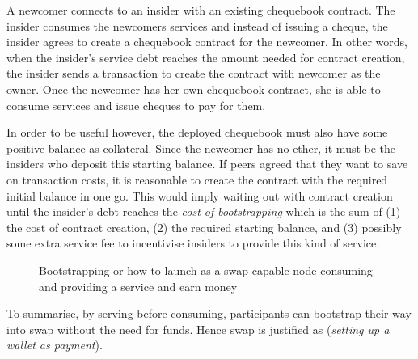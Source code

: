 A newcomer connects to  an insider with an existing chequebook contract. The insider consumes the newcomers services and instead of issuing a cheque, the insider agrees to create a chequebook contract for the newcomer. In other words, when the insider's service debt reaches the amount needed for contract creation, the insider sends a transaction to create the contract with newcomer as the owner. Once the newcomer has her own chequebook contract, she is able to consume services and issue cheques to pay for them.
 
In order to be useful however, the deployed chequebook must also have some positive balance as collateral. Since the newcomer has no ether, it must be the insiders who deposit this starting balance. If peers agreed that they want to save on transaction costs, it is reasonable to create the contract with the required initial balance in one go. This would imply waiting out with contract creation until the insider's debt reaches the \emph{cost of bootstrapping} which is the sum of (1) the cost of contract creation, (2) the required starting balance, and (3) possibly some extra service fee to incentivise insiders to provide this kind of service.

\begin{center}
\begin{figure}
\begin{center}
\end{center}
\caption{Bootstrapping or how to launch as a swap capable node consuming and providing a
service  and earn money}
\label{fig:bootstrapping}
\end{figure}
\end{center}


To summarise, by serving before consuming, participants can bootstrap their way into swap without the need for funds. Hence swap is justified as (\emph{setting up a wallet as payment}).

